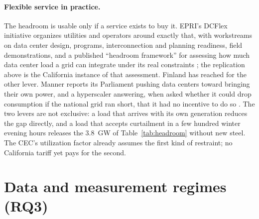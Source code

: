 \paragraph{Flexible service in practice.} The headroom is usable only if a service exists to buy it. EPRI's DCFlex initiative organizes utilities and operators around exactly that, with workstreams on data center design, programs, interconnection and planning readiness, field demonstrations, and a published ``headroom framework'' for assessing how much data center load a grid can integrate under its real constraints \citep{epri_dcflex}; the replication above is the California instance of that assessment. Finland has reached for the other lever. Manner reports its Parliament pushing data centers toward bringing their own power, and a hyperscaler answering, when asked whether it could drop consumption if the national grid ran short, that it had no incentive to do so \citep{manner2026}. The two levers are not exclusive: a load that arrives with its own generation reduces the gap directly, and a load that accepts curtailment in a few hundred winter evening hours releases the 3.8~GW of Table~\ref{tab:headroom} without new steel. The CEC's utilization factor already assumes the first kind of restraint; no California tariff yet pays for the second.

\section{Data and measurement regimes (RQ3)}
\label{sec:regimes}

